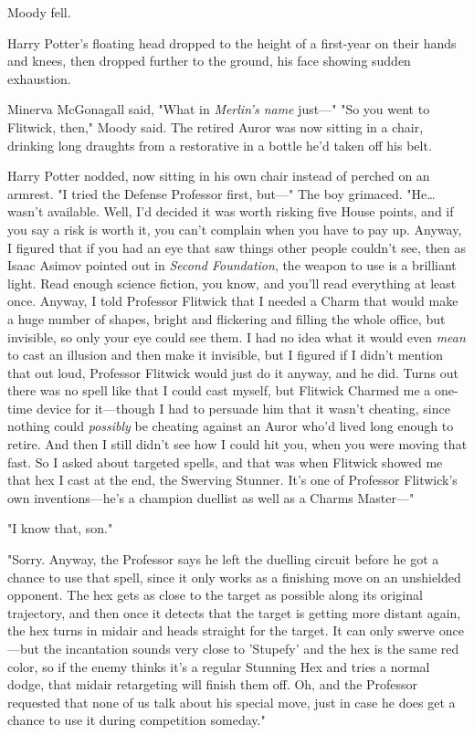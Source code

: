 Moody fell.

Harry Potter's floating head dropped to the height of a first-year on their 
hands and knees, then dropped further to the ground, his face showing sudden 
exhaustion.

Minerva McGonagall said, "What in \emph{Merlin's name} just---"
\sbreak
"So you went to Flitwick, then," Moody said. The retired Auror was now sitting 
in a chair, drinking long draughts from a restorative in a bottle he'd taken 
off his belt.

Harry Potter nodded, now sitting in his own chair instead of perched on an 
armrest. "I tried the Defense Professor first, but---" The boy grimaced. 
"He{\ldots} wasn't available. Well, I'd decided it was worth risking five House 
points, and if you say a risk is worth it, you can't complain when you have to 
pay up. Anyway, I figured that if you had an eye that saw things other people 
couldn't see, then as Isaac Asimov pointed out in \emph{Second Foundation}, the 
weapon to use is a brilliant light. Read enough science fiction, you know, and 
you'll read everything at least once. Anyway, I told Professor Flitwick that I 
needed a Charm that would make a huge number of shapes, bright and flickering 
and filling the whole office, but invisible, so only your eye could see them. I 
had no idea what it would even \emph{mean} to cast an illusion and then make it 
invisible, but I figured if I didn't mention that out loud, Professor Flitwick 
would just do it anyway, and he did. Turns out there was no spell like that I 
could cast myself, but Flitwick Charmed me a one-time device for it---though I 
had to persuade him that it wasn't cheating, since nothing could 
\emph{possibly} be cheating against an Auror who'd lived long enough to retire. 
And then I still didn't see how I could hit you, when you were moving that 
fast. So I asked about targeted spells, and that was when Flitwick showed me 
that hex I cast at the end, the Swerving Stunner. It's one of Professor 
Flitwick's own inventions---he's a champion duellist as well as a Charms 
Master---"

"I know that, son."

"Sorry. Anyway, the Professor says he left the duelling circuit before he got a 
chance to use that spell, since it only works as a finishing move on an 
unshielded opponent. The hex gets as close to the target as possible along its 
original trajectory, and then once it detects that the target is getting more 
distant again, the hex turns in midair and heads straight for the target. It 
can only swerve once---but the incantation sounds very close to 'Stupefy' and 
the hex is the same red color, so if the enemy thinks it's a regular Stunning 
Hex and tries a normal dodge, that midair retargeting will finish them off. Oh, 
and the Professor requested that none of us talk about his special move, just 
in case he does get a chance to use it during competition someday."

